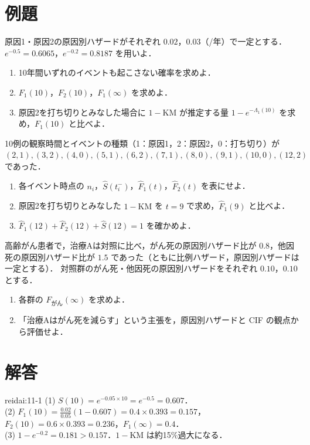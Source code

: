 \section{例題}\label{sec:11-ex}
\begin{reidai}[一定の原因別ハザード]\label{reidai:11-1}
原因1・原因2の原因別ハザードがそれぞれ $0.02$，$0.03$（/年）で一定とする．$e^{-0.5}=0.6065$，$e^{-0.2}=0.8187$ を用いよ．
\begin{enumerate}[label=(\arabic*)]
\item 10年間いずれのイベントも起こさない確率を求めよ．
\item $F_1(10)$，$F_2(10)$，$F_1(\infty)$ を求めよ．
\item 原因2を打ち切りとみなした場合に $1-\mathrm{KM}$ が推定する量 $1-e^{-\Lambda_1(10)}$ を求め，$F_1(10)$ と比べよ．
\end{enumerate}
\end{reidai}

\begin{reidai}\label{reidai:11-2}
10例の観察時間とイベントの種類（1：原因1，2：原因2，0：打ち切り）が
$(2,1),(3,2),(4,0),(5,1),(6,2),(7,1),(8,0),(9,1),(10,0),(12,2)$ であった．
\begin{enumerate}[label=(\arabic*)]
\item 各イベント時点の $n_i$，$\hat S(t_i^-)$，$\hat F_1(t)$，$\hat F_2(t)$ を表にせよ．
\item 原因2を打ち切りとみなした $1-\mathrm{KM}$ を $t=9$ で求め，$\hat F_1(9)$ と比べよ．
\item $\hat F_1(12)+\hat F_2(12)+\hat S(12)=1$ を確かめよ．
\end{enumerate}
\end{reidai}

\begin{reidai}[モデルの解釈]\label{reidai:11-3}
高齢がん患者で，治療Aは対照に比べ，がん死の原因別ハザード比が $0.8$，他因死の原因別ハザード比が $1.5$ であった（ともに比例ハザード，原因別ハザードは一定とする）．
対照群のがん死・他因死の原因別ハザードをそれぞれ $0.10$，$0.10$ とする．
\begin{enumerate}[label=(\arabic*)]
\item 各群の $F_{\text{がん}}(\infty)$ を求めよ．
\item 「治療Aはがん死を減らす」という主張を，原因別ハザードと CIF の観点から評価せよ．
\end{enumerate}
\end{reidai}

\section{解答}\label{sec:11-sol}
\begin{kaitou}{reidai:11-1}
(1) $S(10)=e^{-0.05\times10}=e^{-0.5}=0.607$．\\
(2) $F_1(10)=\frac{0.02}{0.05}(1-0.607)=0.4\times0.393=0.157$，$F_2(10)=0.6\times0.393=0.236$，$F_1(\infty)=0.4$．\\
(3) $1-e^{-0.2}=0.181>0.157$．$1-\mathrm{KM}$ は約15\%過大になる．
\end{kaitou}

